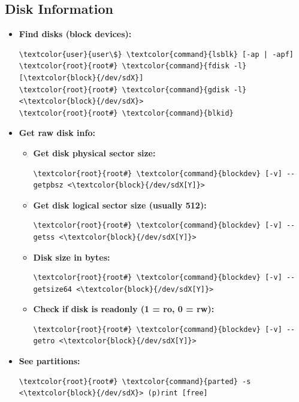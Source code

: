 \documentclass[10pt, a4paper, onecolumn, oneside, titlepage, openany]{book}
\begin{document}
\subsection{Disk Information}
\begin{itemize}
    \item \textbf{Find disks (block devices):}
\begin{Verbatim}[commandchars=\\\{\}]
\textcolor{user}{user\$} \textcolor{command}{lsblk} [-ap | -apf]
\textcolor{root}{root#} \textcolor{command}{fdisk -l} [\textcolor{block}{/dev/sdX}]
\textcolor{root}{root#} \textcolor{command}{gdisk -l} <\textcolor{block}{/dev/sdX}>
\textcolor{root}{root#} \textcolor{command}{blkid}
\end{Verbatim}
    \item \textbf{Get raw disk info:}
    \begin{itemize}
        \item \textbf{Get disk physical sector size:}
\begin{Verbatim}[commandchars=\\\{\}]
\textcolor{root}{root#} \textcolor{command}{blockdev} [-v] --getpbsz <\textcolor{block}{/dev/sdX[Y]}>
\end{Verbatim}
        \item \textbf{Get disk logical sector size (usually 512):}
\begin{Verbatim}[commandchars=\\\{\}]
\textcolor{root}{root#} \textcolor{command}{blockdev} [-v] --getss <\textcolor{block}{/dev/sdX[Y]}>
\end{Verbatim}
        \item \textbf{Disk size in bytes:}
\begin{Verbatim}[commandchars=\\\{\}]
\textcolor{root}{root#} \textcolor{command}{blockdev} [-v] --getsize64 <\textcolor{block}{/dev/sdX[Y]}>
\end{Verbatim}
    \item \textbf{Check if disk is readonly (1 = ro, 0 = rw):}
\begin{Verbatim}[commandchars=\\\{\}]
\textcolor{root}{root#} \textcolor{command}{blockdev} [-v] --getro <\textcolor{block}{/dev/sdX[Y]}>
\end{Verbatim}
    \end{itemize}
    \item \textbf{See partitions:}
\begin{Verbatim}[commandchars=\\\{\}]
\textcolor{root}{root#} \textcolor{command}{parted} -s <\textcolor{block}{/dev/sdX}> (p)rint [free]
\end{Verbatim}
\end{itemize}
\end{document}

